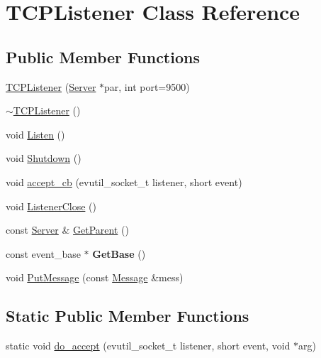 \hypertarget{class_t_c_p_listener}{}\section{T\+C\+P\+Listener Class Reference}
\label{class_t_c_p_listener}
\subsection*{Public Member Functions}
\begin{DoxyCompactItemize}
\item 
\hyperlink{class_t_c_p_listener_a48b6153b937ca62a53e9c17e0b05b43d}{T\+C\+P\+Listener} (\hyperlink{class_server}{Server} $\ast$par, int port=9500)
\item 
\hyperlink{class_t_c_p_listener_af7e560c0c6c0ea486113dc6eabc4226d}{$\sim$\+T\+C\+P\+Listener} ()
\item 
void \hyperlink{class_t_c_p_listener_a5174b5924d90192d653d80c8ba36bed6}{Listen} ()
\item 
void \hyperlink{class_t_c_p_listener_ae41a4b64b93ad9bf32ac393e274cd0a2}{Shutdown} ()
\item 
void \hyperlink{class_t_c_p_listener_aa3635eb89ea270d5dbab3b9a8da07835}{accept\+\_\+cb} (evutil\+\_\+socket\+\_\+t listener, short event)
\item 
void \hyperlink{class_t_c_p_listener_a9052d98857ad3909adb4245e3a53f17f}{Listener\+Close} ()
\item 
const \hyperlink{class_server}{Server} \& \hyperlink{class_t_c_p_listener_a2d5ef87aa89edb85a6e0a002ee560758}{Get\+Parent} ()
\item 
\hypertarget{class_t_c_p_listener_a3ea7e57f298555e48962d97254595b37}{}const event\+\_\+base $\ast$ {\bfseries Get\+Base} ()\label{class_t_c_p_listener_a3ea7e57f298555e48962d97254595b37}

\item 
void \hyperlink{class_t_c_p_listener_a630b07ccc756f5b302bb69c83b675872}{Put\+Message} (const \hyperlink{class_message}{Message} \&mess)
\end{DoxyCompactItemize}
\subsection*{Static Public Member Functions}
\begin{DoxyCompactItemize}
\item 
static void \hyperlink{class_t_c_p_listener_af39a0d5b95386644c7a22966301f4bc0}{do\+\_\+accept} (evutil\+\_\+socket\+\_\+t listener, short event, void $\ast$arg)
\end{DoxyCompactItemize}


